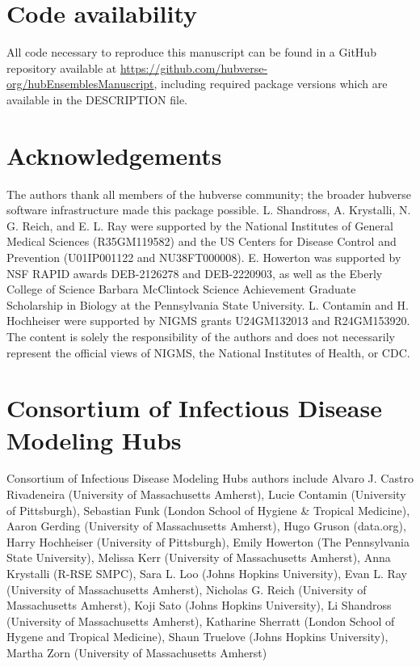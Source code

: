 \documentclass[
  letterpaper,
  DIV=11,
  numbers=noendperiod]{scrartcl}
\begin{document}
\section*{Code availability}\label{code-availability}

All code necessary to reproduce this manuscript can be found in a GitHub
repository available at
\url{https://github.com/hubverse-org/hubEnsemblesManuscript}, including
required package versions which are available in the DESCRIPTION file.

\section*{Acknowledgements}\label{acknowledgements}

The authors thank all members of the hubverse community; the broader
hubverse software infrastructure made this package possible. L.
Shandross, A. Krystalli, N. G. Reich, and E. L. Ray were supported by
the National Institutes of General Medical Sciences (R35GM119582) and
the US Centers for Disease Control and Prevention (U01IP001122 and
NU38FT000008). E. Howerton was supported by NSF RAPID awards DEB-2126278
and DEB-2220903, as well as the Eberly College of Science Barbara
McClintock Science Achievement Graduate Scholarship in Biology at the
Pennsylvania State University. L. Contamin and H. Hochheiser were
supported by NIGMS grants U24GM132013 and R24GM153920. The content is
solely the responsibility of the authors and does not necessarily
represent the official views of NIGMS, the National Institutes of
Health, or CDC.

\section*{Consortium of Infectious Disease Modeling
Hubs}\label{consortium-of-infectious-disease-modeling-hubs}

Consortium of Infectious Disease Modeling Hubs authors include Alvaro J.
Castro Rivadeneira (University of Massachusetts Amherst), Lucie Contamin
(University of Pittsburgh), Sebastian Funk (London School of Hygiene \&
Tropical Medicine), Aaron Gerding (University of Massachusetts Amherst),
Hugo Gruson (data.org), Harry Hochheiser (University of Pittsburgh),
Emily Howerton (The Pennsylvania State University), Melissa Kerr
(University of Massachusetts Amherst), Anna Krystalli (R-RSE SMPC), Sara
L. Loo (Johns Hopkins University), Evan L. Ray (University of
Massachusetts Amherst), Nicholas G. Reich (University of Massachusetts
Amherst), Koji Sato (Johns Hopkins University), Li Shandross (University
of Massachusetts Amherst), Katharine Sherratt (London School of Hygene
and Tropical Medicine), Shaun Truelove (Johns Hopkins University),
Martha Zorn (University of Massachusetts Amherst)
\end{document}

